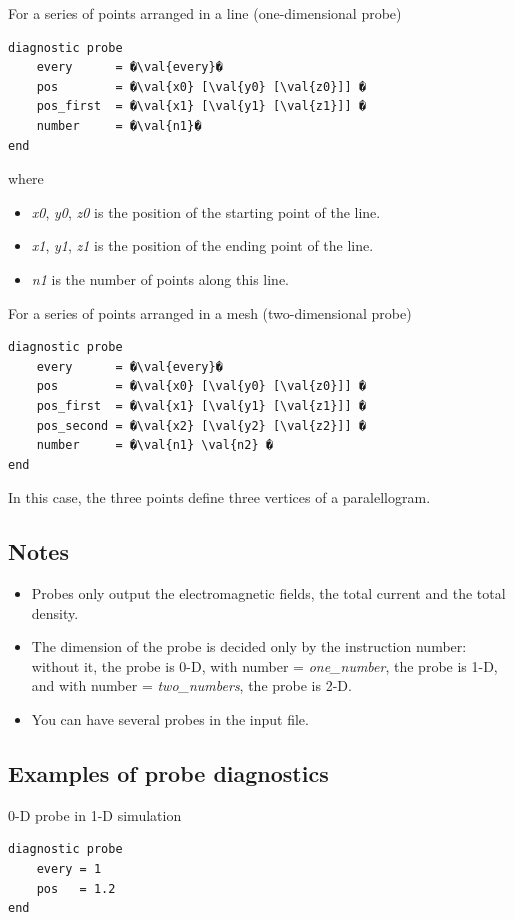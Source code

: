 \documentclass[11pt]{article}
\newcommand{\code}[1]{\colorbox{yellow!15}{\ttfamily #1}}
\newcommand{\val}[1]{{\ttfamily \textit{#1}}}
\begin{document}
For a series of points arranged in a line (one-dimensional probe)
\begin{lstlisting}
diagnostic probe
    every      = �\val{every}�
    pos        = �\val{x0} [\val{y0} [\val{z0}]] �
    pos_first  = �\val{x1} [\val{y1} [\val{z1}]] �
    number     = �\val{n1}�
end
\end{lstlisting}
where
\begin{itemize}
\item \val{x0}, \val{y0}, \val{z0} is the position of the starting point of the line.
\item \val{x1}, \val{y1}, \val{z1} is the position of the ending point of the line.
\item \val{n1} is the number of points along this line.
\end{itemize}

For a series of points arranged in a mesh (two-dimensional probe)
\begin{lstlisting}
diagnostic probe
    every      = �\val{every}�
    pos        = �\val{x0} [\val{y0} [\val{z0}]] �
    pos_first  = �\val{x1} [\val{y1} [\val{z1}]] �
    pos_second = �\val{x2} [\val{y2} [\val{z2}]] �
    number     = �\val{n1} \val{n2} �
end
\end{lstlisting}
In this case, the three points define three vertices of a paralellogram.

\subsection*{Notes}
\begin{itemize}
\item Probes only output the electromagnetic fields, the total current and the total density.
\item The dimension of the probe is decided only by the instruction \code{number}: without it, the probe is 0-D, with \code{number = \val{one\_number}}, the probe is 1-D, and with \code{number = \val{two\_numbers}}, the probe is 2-D.
\item You can have several probes in the input file.
\end{itemize}


\subsection*{Examples of probe diagnostics}

0-D probe in 1-D simulation
\begin{lstlisting}
diagnostic probe
    every = 1
    pos   = 1.2
end
\end{lstlisting}
\end{document}
